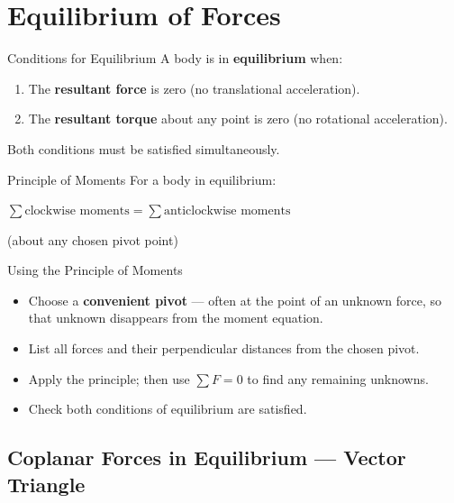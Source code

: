 \pagebreak

\section{Equilibrium of Forces}

\begin{definitionbox}{Conditions for Equilibrium}
A body is in \textbf{equilibrium} when:
\begin{enumerate}[itemsep=2pt]
  \item The \textbf{resultant force} is zero (no translational acceleration).
  \item The \textbf{resultant torque} about any point is zero (no rotational acceleration).
\end{enumerate}
Both conditions must be satisfied simultaneously.
\end{definitionbox}

\begin{formulabox}{Principle of Moments}
For a body in equilibrium:
\begin{center}
\large $\sum \text{clockwise moments} = \sum \text{anticlockwise moments}$
\end{center}
(about any chosen pivot point)
\end{formulabox}

\begin{keybox}{Using the Principle of Moments}
\begin{itemize}[itemsep=2pt]
  \item Choose a \textbf{convenient pivot} — often at the point of an unknown force, so that unknown disappears from the moment equation.
  \item List all forces and their perpendicular distances from the chosen pivot.
  \item Apply the principle; then use $\sum F = 0$ to find any remaining unknowns.
  \item Check both conditions of equilibrium are satisfied.
\end{itemize}
\end{keybox}



\subsection{Coplanar Forces in Equilibrium — Vector Triangle}

